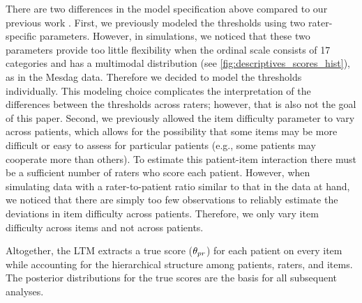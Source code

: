 \documentclass[a4paper,11pt]{article}
\newcommand{\DB}[1]{\todo[inline, color=colorDon,caption={}]{DB: {#1}}}
\newcommand{\EJ}[1]{\todo[inline, color=colorEJ]{EJ: {#1}}}
\begin{document}
There are two differences in the model specification above compared to our previous work \parencite{vandenBergh2020cultural}.
First, we previously modeled the thresholds using two rater-specific parameters.
However, in simulations, we noticed that these two parameters provide too little flexibility when the ordinal scale consists of 17 categories and has a multimodal distribution (see \autoref{fig:descriptives_scores_hist}), as in the Mesdag data.
Therefore we decided to model the thresholds individually.
This modeling choice complicates the interpretation of the differences between the thresholds across raters; however, that is also not the goal of this paper.
Second, we previously allowed the item difficulty parameter to vary across patients, which allows for the possibility that some items may be more difficult or easy to assess for particular patients (e.g., some patients may cooperate more than others).
To estimate this patient-item interaction there must be a sufficient number of raters who score each patient.
However, when simulating data with a rater-to-patient ratio similar to that in the data at hand, we noticed that there are simply too few observations to reliably estimate the deviations in item difficulty across patients.
Therefore, we only vary item difficulty across items and not across patients.

Altogether, the LTM extracts a true score ($\theta_{pr}$) for each patient on every item while accounting for the hierarchical structure among patients, raters, and items.
The posterior distributions for the true scores are the basis for all subsequent analyses. 



%
%
%
%
%
\end{document}
